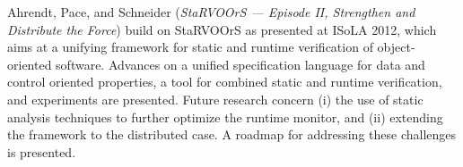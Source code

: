

Ahrendt, Pace, and Schneider
\cite{isola-2016-ahrendt}
({\em StaRVOOrS — Episode II, Strengthen and Distribute the Force})
build on StaRVOOrS as presented at ISoLA 2012, which aims at a unifying framework for static and runtime verification of object-oriented software. 
Advances on a unified
specification language for data and control oriented properties, a
tool for combined static and runtime verification, and experiments are
presented. Future research concern (i) the use of static analysis techniques to further optimize the runtime monitor, and (ii) extending the framework to the distributed case. A roadmap for addressing these challenges is presented.

